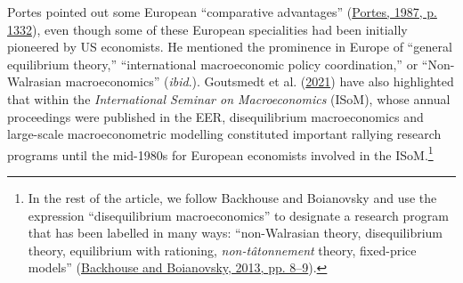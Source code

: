 \documentclass[
  12pt,
  onecolumn]{article}
\begin{document}
Portes pointed out some European ``comparative advantages''
(\protect\hyperlink{ref-portes1987}{Portes, 1987, p. 1332}), even though
some of these European specialities had been initially pioneered by US
economists. He mentioned the prominence in Europe of ``general
equilibrium theory,'' ``international macroeconomic policy
coordination,'' or ``Non-Walrasian macroeconomics'' (\emph{ibid}.).
Goutsmedt et al. (\protect\hyperlink{ref-goutsmedt2021}{2021}) have also
highlighted that within the \emph{International Seminar on
Macroeconomics} (ISoM), whose annual proceedings were published in the
EER, disequilibrium macroeconomics and large-scale macroeconometric
modelling constituted important rallying research programs until the
mid-1980s for European economists involved in the ISoM.\footnote{In the
  rest of the article, we follow Backhouse and Boianovsky and use the
  expression ``disequilibrium macroeconomics'' to designate a research
  program that has been labelled in many ways: ``non-Walrasian theory,
  disequilibrium theory, equilibrium with rationing,
  \emph{non-tâtonnement} theory, fixed-price models''
  (\protect\hyperlink{ref-backhouseboianovski2013}{Backhouse and
  Boianovsky, 2013, pp. 8--9}).}
\end{document}
